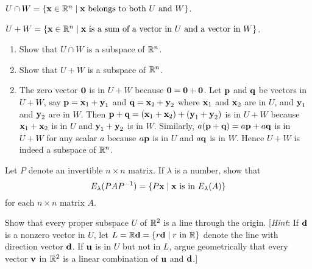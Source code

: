 \begin{multicols}{2}
\begin{ex}
$U \cap W = \{\textbf{x} \in \mathbb{R}^n \mid \textbf{x}\mbox{ belongs to both } U \mbox{ and } W\}$. 

$U + W = \{\textbf{x} \in \mathbb{R}^n \mid \textbf{x}\mbox{ is a sum of a vector in } U \\ \mbox{ and a vector in } W\}$.

\begin{enumerate}[label={\alph*.}]
\item Show that $U \cap W$ is a subspace of $\mathbb{R}^n$.

\item Show that $U + W$ is a subspace of $\mathbb{R}^n$.

\end{enumerate}
\begin{sol}
\begin{enumerate}[label={\alph*.}]
\setcounter{enumi}{1}
\item  The zero vector $\textbf{0}$ is in $U + W$ because $\textbf{0} = \textbf{0} + \textbf{0}$. Let $\textbf{p}$ and $\textbf{q}$ be vectors in $U + W$, say $\textbf{p} = \textbf{x}_{1} + \textbf{y}_{1}$ and $\textbf{q} = \textbf{x}_{2} + \textbf{y}_{2}$ where $\textbf{x}_{1}$ and $\textbf{x}_{2}$ are in $U$, and $\textbf{y}_{1}$ and $\textbf{y}_{2}$ are in $W$. Then $\textbf{p} + \textbf{q} = (\textbf{x}_{1} + \textbf{x}_{2}) + (\textbf{y}_{1} + \textbf{y}_{2})$ is in $U + W$ because $\textbf{x}_{1} + \textbf{x}_{2}$ is in $U$ and $\textbf{y}_{1} + \textbf{y}_{2}$ is in $W$. Similarly, $a(\textbf{p} + \textbf{q}) = a\textbf{p} + a\textbf{q}$ is in $U + W$ for any scalar $a$ because $a\textbf{p}$ is in $U$ and $a\textbf{q}$ is in $W$. Hence $U + W$ is indeed a subspace of $\mathbb{R}^n$.

\end{enumerate}
\end{sol}
\end{ex}

\begin{ex}
Let $P$ denote an invertible $n \times n$ matrix. If $\lambda$ is a number, show that 
\begin{equation*}
E_{\lambda}(PAP^{-1}) = \{P\textbf{x} \mid \textbf{x} \mbox{ is in } E_{\lambda}(A)\}
\end{equation*}
for each $n \times n$ matrix $A$.
\end{ex}

\begin{ex}\label{ex:5_1_24}
Show that every proper subspace $U$ of $\mathbb{R}^2$ is a line through the origin. [\textit{Hint}: If $\textbf{d}$ is a nonzero vector in $U$, let $L = \mathbb{R} \textbf{d} = \{r\textbf{d} \mid r \mbox{ in }\mathbb{R}\}$ denote the line with direction vector $\textbf{d}$. If $\textbf{u}$ is in $U$ but not in $L$, argue geometrically that every vector $\textbf{v}$ in $\mathbb{R}^2$ is a linear combination of $\textbf{u}$ and $\textbf{d}$.]
\end{ex}
\end{multicols}
